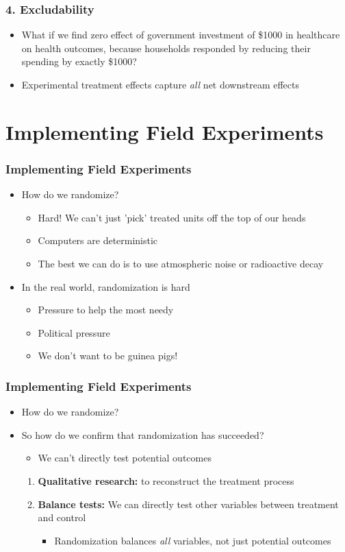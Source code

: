 \documentclass[xcolor=x11names,compress]{beamer}\usepackage[]{graphicx}\usepackage[]{color}
\renewcommand{\(}{\begin{columns}}
\renewcommand{\)}{\end{columns}}
\newcommand{\<}[1]{\begin{column}{#1}}
\renewcommand{\>}{\end{column}}
\begin{document}
\begin{frame}
\frametitle{4. Excludability}
\begin{itemize}
\item What if we find zero effect of government investment of \$1000 in healthcare on health outcomes, because households responded by reducing their spending by exactly \$1000?
\pause
\item Experimental treatment effects capture \textit{all} net downstream effects
\end{itemize}
\end{frame}

\section{Implementing Field Experiments}

\begin{frame}
\frametitle{Implementing Field Experiments}
\begin{itemize}
\item How do we randomize?
\begin{itemize}
\item Hard! We can't just 'pick' treated units off the top of our heads
\pause
\item Computers are deterministic
\pause
\item The best we can do is to use atmospheric noise or radioactive decay
\pause
\end{itemize}
\item In the real world, randomization is hard
\begin{itemize}
\item Pressure to help the most needy
\pause
\item Political pressure
\pause
\item We don't want to be guinea pigs!
\end{itemize}
\end{itemize}
\end{frame}

\begin{frame}
\frametitle{Implementing Field Experiments}
\begin{itemize}
\item How do we randomize?
\pause
\item So how do we confirm that randomization has succeeded?
\pause
\begin{itemize}
\item We can't directly test potential outcomes
\end{itemize}
\begin{enumerate}
\item \textbf{Qualitative research:} to reconstruct the treatment process
\pause
\item \textbf{Balance tests:} We can directly test other variables between treatment and control
\begin{itemize}
\item Randomization balances \textit{all} variables, not just potential outcomes
\end{itemize}
\end{enumerate}
\end{itemize}
\end{frame}
\end{document}
